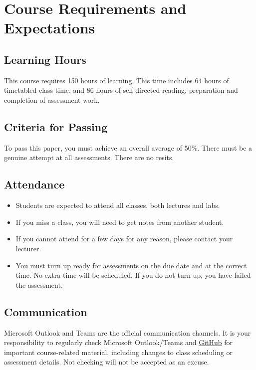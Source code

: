 \documentclass{article}
\begin{document}
\section*{Course Requirements and Expectations}

\subsection*{Learning Hours}
This course requires 150 hours of learning. This time includes 64 hours of timetabled class time, and 86 hours of self-directed reading, preparation and completion of assessment work.

\subsection*{Criteria for Passing}
To pass this paper, you must achieve an overall average of 50\%. There must be a genuine attempt at all assessments. There are no resits.

\subsection*{Attendance}
\begin{itemize}
	\item Students are expected to attend all classes, both lectures and labs.
	\item If you miss a class, you will need to get notes from another student.
	\item If you cannot attend for a few days for any reason, please contact your lecturer.
	\item You must turn up ready for assessments on the due date and at the correct time. No extra time will be scheduled. If you do not turn up, you have failed the assessment.
\end{itemize}

\subsection*{Communication}
Microsoft Outlook and Teams are the official communication channels. It is your responsibility to regularly check Microsoft Outlook/Teams and \href{https://github.com/otago-polytechnic-bit-courses/intermediate-app-dev-concepts}{GitHub} for important course-related material, including changes to class scheduling or assessment details. Not checking will not be accepted as an excuse.
\end{document}
